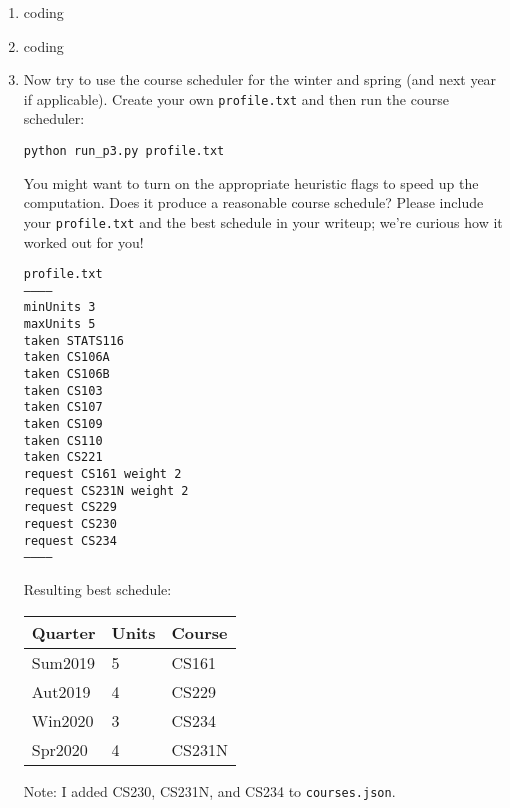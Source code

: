 \documentclass[10pt]{article}
\begin{document}
\begin{enumerate}[label=(\alph*)]

  \item coding
  
  \item coding
  
  \item Now try to use the course scheduler for the winter and spring (and next year if applicable). Create your own \texttt{profile.txt} and then run the course scheduler:

	\texttt{python run\_p3.py profile.txt}

	You might want to turn on the appropriate heuristic flags to speed up the computation. Does it produce a reasonable course schedule? Please include your \texttt{profile.txt} and the best schedule in your writeup; we're curious how it worked out for you!

	\texttt{profile.txt}\\
	\texttt{-----------}\\
	\texttt{minUnits 3}\\
	\texttt{maxUnits 5}\\
	\texttt{taken STATS116}\\
	\texttt{taken CS106A}\\
	\texttt{taken CS106B}\\
	\texttt{taken CS103}\\
	\texttt{taken CS107}\\
	\texttt{taken CS109}\\
	\texttt{taken CS110}\\
	\texttt{taken CS221}\\
	\texttt{request CS161 weight 2}\\
	\texttt{request CS231N weight 2}\\
	\texttt{request CS229}\\
	\texttt{request CS230}\\
	\texttt{request CS234}\\
	\texttt{-----------}

	Resulting best schedule:\\
		\begin{tabular}{l l l}
			Quarter & Units & Course\\
			\hline
	  		Sum2019 & 5 & CS161\\
	  		Aut2019 & 4 & CS229\\
	  		Win2020 & 3 & CS234\\
	  		Spr2020 & 4 & CS231N\\
	  	\end{tabular}
	  	
	  	Note: I added CS230, CS231N, and CS234 to \texttt{courses.json}.

\end{enumerate}
\iffalse
\end{document}
